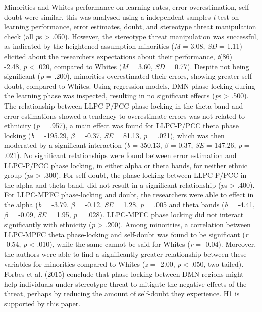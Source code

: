 \documentclass[
  stu,floatsintext]{apa7}
\begin{document}
Minorities and Whites performance on learning rates, error overestimation, self-doubt were similar, this was analysed using a independent samples \emph{t}-test on learning performance, error estimates, doubt, and stereotype threat manipulation check (all \emph{p}s \textgreater{} .050).
However, the stereotype threat manipulation was successful, as indicated by the heightened assumption minorities (\emph{M} = 3.08, \emph{SD} = 1.11) elicited about the researchers expectations about their performance, \emph{t}(86) = -2.48, \emph{p} \textless{} .020, compared to Whites (\emph{M} = 3.60, \emph{SD} = 0.77).
Despite not being significant (\emph{p} = .200), minorities overestimated their errors, showing greater self-doubt, compared to Whites.
Using regression models, DMN phase-locking during the learning phase was inspected, resulting in no significant effects (\emph{p}s \textgreater{} .500).
The relationship between LLPC-P/PCC phase-locking in the theta band and error estimations showed a tendency to overestimate errors was not related to ethnicity (\emph{p} = .957), a main effect was found for LLPC-P/PCC theta phase locking (\emph{b} = -195.29, \(\beta\) = -0.37, \emph{SE} = 81.13, \emph{p} = .021), which was then moderated by a significant interaction (\emph{b} = 350.13, \(\beta\) = 0.37, \emph{SE} = 147.26, \emph{p} = .021).
No significant relationships were found between error estimation and LLPC-P/PCC phase locking, in either alpha or theta bands, for neither ethnic group (\emph{p}s \textgreater{} .300).
For self-doubt, the phase-locking between LLPC-P/PCC in the alpha and theta band, did not result in a significant relationship (\emph{p}s \textgreater{} .400).
For LLPC-MPFC phase-locking and doubt, the researchers were able to effect in the alpha (\emph{b} = -3.79, \(\beta\) = -0.12, \emph{SE} = 1.28, \emph{p} = .005 and theta bands (\emph{b} = -4.41, \(\beta\) = -0.09, \emph{SE} = 1.95, \emph{p} = .028).
LLPC-MPFC phase locking did not interact significantly with ethnicity (\emph{p} \textgreater{} .200).
Among minorities, a correlation between LLPC-MPFC theta phase-locking and self-doubt was found to be significant (\emph{r} = -0.54, \emph{p} \textless{} .010), while the same cannot be said for Whites (\emph{r} = -0.04).
Moreover, the authors were able to find a significantly greater relationship between these variables for minorities compared to Whites (\emph{z} = -2.00, \emph{p} \textless{} .050, two-tailed).\\
Forbes et al. (2015) conclude that phase-locking between DMN regions might help individuals under stereotype threat to mitigate the negative effects of the threat, perhaps by reducing the amount of self-doubt they experience.
H1 is supported by this paper.
\end{document}
